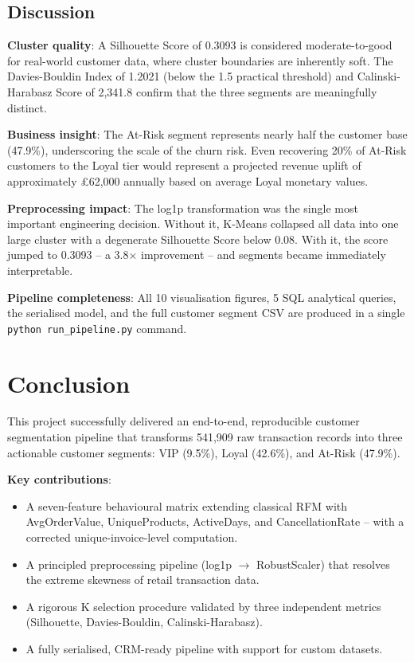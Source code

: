 \documentclass[12pt,a4paper]{report}
\begin{document}
\section{Discussion}

\textbf{Cluster quality}: A Silhouette Score of 0.3093 is considered moderate-to-good for real-world customer data, where cluster boundaries are inherently soft. The Davies-Bouldin Index of 1.2021 (below the 1.5 practical threshold) and Calinski-Harabasz Score of 2,341.8 confirm that the three segments are meaningfully distinct.

\textbf{Business insight}: The At-Risk segment represents nearly half the customer base (47.9\%), underscoring the scale of the churn risk. Even recovering 20\% of At-Risk customers to the Loyal tier would represent a projected revenue uplift of approximately £62,000 annually based on average Loyal monetary values.

\textbf{Preprocessing impact}: The log1p transformation was the single most important engineering decision. Without it, K-Means collapsed all data into one large cluster with a degenerate Silhouette Score below 0.08. With it, the score jumped to 0.3093 -- a 3.8$\times$ improvement -- and segments became immediately interpretable.

\textbf{Pipeline completeness}: All 10 visualisation figures, 5 SQL analytical queries, the serialised model, and the full customer segment CSV are produced in a single \texttt{python run\_pipeline.py} command.

\chapter{Conclusion}

This project successfully delivered an end-to-end, reproducible customer segmentation pipeline that transforms 541,909 raw transaction records into three actionable customer segments: VIP (9.5\%), Loyal (42.6\%), and At-Risk (47.9\%).

\textbf{Key contributions}:
\begin{itemize}[leftmargin=1.8em]
  \item A seven-feature behavioural matrix extending classical RFM with AvgOrderValue, UniqueProducts, ActiveDays, and CancellationRate -- with a corrected unique-invoice-level computation.
  \item A principled preprocessing pipeline (log1p $\rightarrow$ RobustScaler) that resolves the extreme skewness of retail transaction data.
  \item A rigorous K selection procedure validated by three independent metrics (Silhouette, Davies-Bouldin, Calinski-Harabasz).
  \item A fully serialised, CRM-ready pipeline with support for custom datasets.
\end{itemize}
\end{document}
